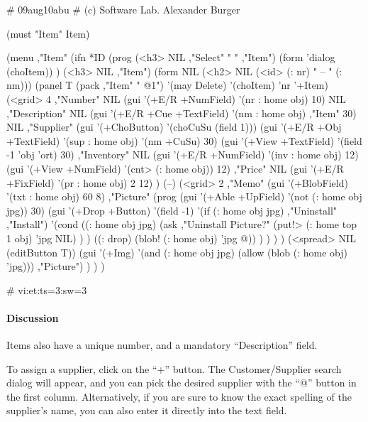 \begin{wideverbatim}

# 09aug10abu
# (c) Software Lab. Alexander Burger

(must "Item" Item)

(menu ,"Item"
   (ifn *ID
      (prog
         (<h3> NIL ,"Select" " " ,"Item")
         (form 'dialog (choItem)) )
      (<h3> NIL ,"Item")
      (form NIL
         (<h2> NIL (<id> (: nr) " -- " (: nm)))
         (panel T (pack ,"Item" " @1") '(may Delete) '(choItem) 'nr '+Item)
         (<grid> 4
            ,"Number" NIL (gui '(+E/R +NumField) '(nr : home obj) 10) NIL
            ,"Description" NIL (gui '(+E/R +Cue +TextField) '(nm : home obj) ,"Item" 30) NIL
            ,"Supplier" (gui '(+ChoButton) '(choCuSu (field 1)))
            (gui '(+E/R +Obj +TextField) '(sup : home obj) '(nm +CuSu) 30)
            (gui '(+View +TextField) '(field -1 'obj 'ort) 30)
            ,"Inventory" NIL (gui '(+E/R +NumField) '(inv : home obj) 12)
            (gui '(+View +NumField) '(cnt> (: home obj)) 12)
            ,"Price" NIL (gui '(+E/R +FixField) '(pr : home obj) 2 12) )
         (--)
         (<grid> 2
            ,"Memo" (gui '(+BlobField) '(txt : home obj) 60 8)
            ,"Picture"
            (prog
               (gui '(+Able +UpField) '(not (: home obj jpg)) 30)
               (gui '(+Drop +Button) '(field -1)
                  '(if (: home obj jpg) ,"Uninstall" ,"Install")
                  '(cond
                     ((: home obj jpg)
                        (ask ,"Uninstall Picture?"
                           (put!> (: home top 1 obj) 'jpg NIL) ) )
                     ((: drop) (blob! (: home obj) 'jpg @)) ) ) ) )
         (<spread> NIL (editButton T))
         (gui '(+Img)
            '(and (: home obj jpg) (allow (blob (: home obj) 'jpg)))
            ,"Picture") ) ) )

# vi:et:ts=3:sw=3


\end{wideverbatim}

\paragraph{Discussion}
\label{sec:appl-devel-data-model-discussion}

Items also have a unique number, and a mandatory ``Description'' field.

To assign a supplier, click on the ``+'' button. The Customer/Supplier
search dialog will appear, and you can pick the desired supplier with
the ``@'' button in the first column. Alternatively, if you are sure to
know the exact spelling of the supplier's name, you can also enter it
directly into the text field.

